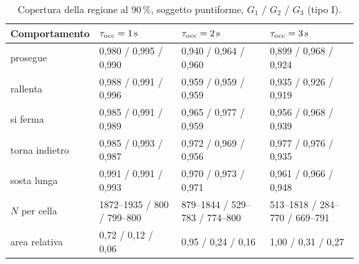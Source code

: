 \begin{table}[H]\centering\footnotesize
\caption{Copertura della regione al 90\,\%, soggetto puntiforme, $G_1$ / $G_2$ / $G_3$ (tipo I). }\label{tab:val-copertura}
\begin{tabular}{@{}llll@{}}
\toprule
Comportamento & $\tau_{\mathrm{occ}}=1\,\mathrm{s}$ & $\tau_{\mathrm{occ}}=2\,\mathrm{s}$ & $\tau_{\mathrm{occ}}=3\,\mathrm{s}$\\
\midrule
prosegue & 0,980 / 0,995 / 0,990 & 0,940 / 0,964 / 0,960 & 0,899 / 0,968 / 0,924\\
rallenta & 0,988 / 0,991 / 0,996 & 0,959 / 0,959 / 0,959 & 0,935 / 0,926 / 0,919\\
si ferma & 0,985 / 0,991 / 0,989 & 0,965 / 0,977 / 0,959 & 0,956 / 0,968 / 0,939\\
torna indietro & 0,985 / 0,993 / 0,987 & 0,972 / 0,969 / 0,956 & 0,977 / 0,976 / 0,935\\
sosta lunga & 0,991 / 0,991 / 0,993 & 0,970 / 0,973 / 0,971 & 0,961 / 0,966 / 0,948\\
\midrule
$N$ per cella & 1872–1935 / 800 / 799–800 & 879–1844 / 529–783 / 774–800 & 513–1818 / 284–770 / 669–791\\
area relativa & 0,72 / 0,12 / 0,06 & 0,95 / 0,24 / 0,16 & 1,00 / 0,31 / 0,27\\
\bottomrule
\end{tabular}
\end{table}

